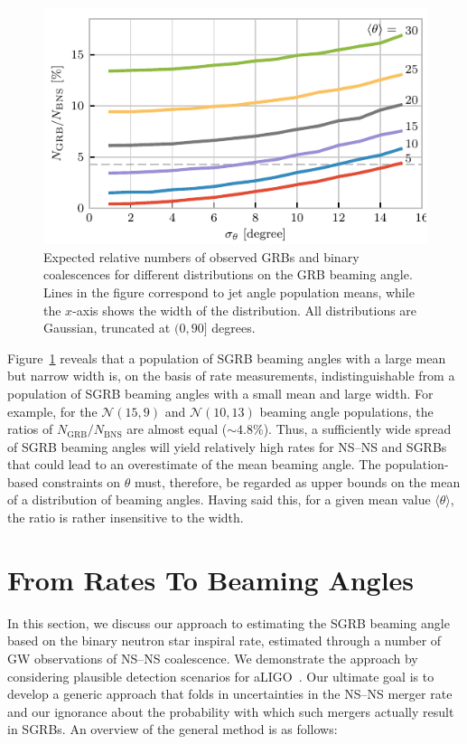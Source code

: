 \documentclass[twocolumn]{aastex61}
\newcommand{\BNS}{\ac{NS}--\ac{NS}\xspace}
\begin{document}
\begin{figure}
\centering
\includegraphics[width=\linewidth]{color_relativenumber.pdf}
\caption{\label{fig:thetapopulation} Expected relative numbers of
  observed GRBs and binary coalescences for different distributions on
  the GRB beaming angle.  Lines in the figure correspond to jet angle
  population means, while the $x$-axis shows the width of the
  distribution.  All distributions are Gaussian, truncated at
  $(0, 90]$ degrees.\label{fig:thetapop}}
\end{figure}




Figure~\ref{fig:thetapop} reveals that a population of \ac{SGRB} beaming angles with a large mean but narrow width is, on the basis of rate measurements, indistinguishable from a population of \ac{SGRB} beaming angles with a small mean and large width.
For example, for the ${\mathcal N}(15,9)$ and ${\mathcal N}(10,13)$ beaming angle populations, the ratios of $N_{\mathrm{GRB}}/N_{\mathrm{BNS}}$ are almost equal ($\sim 4.8\%$).
Thus, a sufficiently wide spread of \ac{SGRB} beaming angles will yield relatively high rates for \BNS and \acp{SGRB} that could lead to an overestimate of the mean beaming angle.
The population-based constraints on $\theta$ must, therefore, be regarded as upper bounds on the mean of a distribution of beaming angles.
Having said this, for a given mean value $\langle \theta \rangle$, the ratio is rather insensitive to the width.


\section{From Rates To Beaming Angles}

In this section, we discuss our approach to estimating the \ac{SGRB} beaming angle based on the binary neutron star inspiral rate, estimated through a number of \ac{GW} observations of \BNS coalescence.
We demonstrate the approach by considering plausible detection scenarios for \ac{aLIGO}~\cite{Aasi:2013wya}.
Our ultimate goal is to develop a generic approach that folds in uncertainties in the \BNS merger rate and our ignorance about the probability with which such mergers actually result in \acp{SGRB}.
%
An overview of the general method is as follows:
\end{document}
